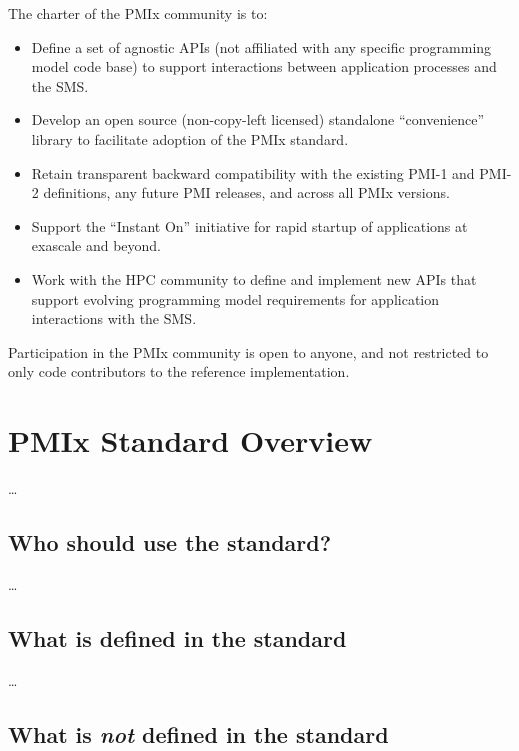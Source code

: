 The charter of the PMIx community is to:
\begin{itemize}
\item Define a set of agnostic APIs (not affiliated with any specific programming model code base) to support interactions between application processes and the \ac{SMS}.
\item Develop an open source (non-copy-left licensed) standalone ``convenience'' library to facilitate adoption of the \ac{PMIx} standard.
\item Retain transparent backward compatibility with the existing PMI-1 and PMI-2 definitions, any future \ac{PMI} releases, and across all \ac{PMIx} versions.
\item Support the ``Instant On'' initiative for rapid startup of applications at exascale and beyond.
\item Work with the \ac{HPC} community to define and implement new APIs that support evolving programming model requirements for application interactions with the \ac{SMS}.
\end{itemize}

Participation in the \ac{PMIx} community is open to anyone, and not restricted to only code contributors to the reference implementation. 


\section{PMIx Standard Overview}
\label{chap:intro:std_overview}

\ldots

\subsection{Who should use the standard?}

\ldots

\subsection{What is defined in the standard}

\ldots

\subsection{What is \emph{not} defined in the standard}

